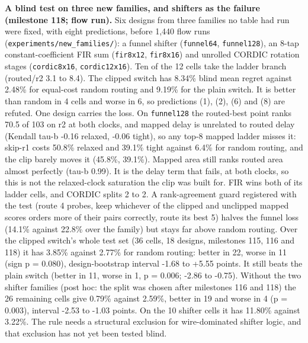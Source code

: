 \documentclass[conference]{IEEEtran}
\begin{document}
\textbf{A blind test on three new families, and shifters as the failure
(milestone 118; flow run).} Six designs from three families no table had
run were fixed, with eight predictions, before 1,440 flow runs
(\texttt{experiments/\allowbreak{}new\_\allowbreak{}families/\allowbreak{}}): a funnel shifter
(\texttt{funnel64}, \texttt{funnel128}), an 8-tap constant-coefficient
FIR sum (\texttt{fir8x12}, \texttt{fir8x16}) and unrolled CORDIC
rotation stages (\texttt{cordic8x16}, \texttt{cordic12x16}). Ten of the
12 cells take the ladder branch (routed/r2 3.1 to 8.4). The clipped
switch has 8.34\% blind mean regret against 2.48\% for equal-cost random
routing and 9.19\% for the plain switch. It is better than random in 4
cells and worse in 6, so predictions (1), (2), (6) and (8) are refuted.
One design carries the loss. On \texttt{funnel128} the routed-best point
ranks 70.5 of 103 on r2 at both clocks, and mapped delay is unrelated to
routed delay (Kendall tau-b -0.16 relaxed, -0.06 tight), so any top-8
mapped ladder misses it: skip-r1 costs 50.8\% relaxed and 39.1\% tight
against 6.4\% for random routing, and the clip barely moves it (45.8\%,
39.1\%). Mapped area still ranks routed area almost perfectly (tau-b
0.99). It is the delay term that fails, at both clocks, so this is not
the relaxed-clock saturation the clip was built for. FIR wins both of
its ladder cells, and CORDIC splits 2 to 2. A rank-agreement guard
registered with the test (route 4 probes, keep whichever of the clipped
and unclipped mapped scores orders more of their pairs correctly, route
its best 5) halves the funnel loss (14.1\% against 22.8\% over the
family) but stays far above random routing. Over the clipped switch's
whole test set (36 cells, 18 designs, milestones 115, 116 and 118) it
has 3.85\% against 2.77\% for random routing: better in 22, worse in 11
(sign p = 0.080), design-bootstrap interval -1.68 to +5.55 points. It
still beats the plain switch (better in 11, worse in 1, p = 0.006; -2.86
to -0.75). Without the two shifter families (post hoc: the split was
chosen after milestones 116 and 118) the 26 remaining cells give 0.79\%
against 2.59\%, better in 19 and worse in 4 (p = 0.003), interval -2.53
to -1.03 points. On the 10 shifter cells it has 11.80\% against 3.22\%.
The rule needs a structural exclusion for wire-dominated shifter logic,
and that exclusion has not yet been tested blind.
\end{document}
